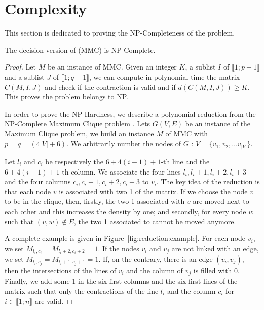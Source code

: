 \section{Complexity}
\label{sect:complexity}
 
This section is dedicated to proving the NP-Completeness of the problem.

  \begin{theorem}
  \label{theo:complexity}
  The decision version of (MMC) is NP-Complete.
  \end{theorem}
  \begin{proof}
 

    Let $M$ be an instance of MMC. Given an integer $K$, a sublist $I$ of $\llbracket 1; p-1 \rrbracket$ and a sublist $J$ of $\llbracket 1; q-1 \rrbracket$, we can compute in polynomial time the matrix $C(M,I,J)$ and check if the contraction is valid and if $d(C(M,I,J)) \geq K$. This proves the problem belongs to NP.

    In order to prove the NP-Hardness, we describe a polynomial reduction from the NP-Complete Maximum Clique problem \cite{Karp1972}. Lets $G(V,E)$ be an instance of the Maximum Clique problem, we build an instance $M$ of MMC with $p = q = (4|V| + 6)$. We arbitrarily number the nodes of $G$ : $V = \{v_1, v_2, \dots v_{|V|}\}$.

    Let $l_i$ and $c_i$ be respectively the $6+4(i-1)+1$-th line and the $6+4(i-1)+1$-th column. We associate the four lines $l_i, l_i+1, l_i+2, l_i+3$ and the four columns $c_i, c_i +1, c_i+2, c_i + 3$ to $v_i$. The key idea of the reduction is that each node $v$ is associated with two 1 of the matrix. If we choose the node $v$ to be in the clique, then, firstly, the two 1 associated with $v$ are moved next to each other and this increases the density by one; and secondly, for every node $w$ such that $(v,w) \not\in E$, the two 1 associated to cannot be moved anymore.

A complete example is given in Figure~\ref{fig:reduction:example}. For each node $v_i$, we set $M_{l_i,c_i} = M_{l_i+2,c_i+2} = 1$. If the nodes $v_i$ and $v_j$ are not linked with an edge, we set $M_{l_i,c_j} = M_{l_i+1,c_j+1} = 1$. If, on the contrary, there is an edge $(v_i,v_j)$, then the intersections of the lines of $v_i$ and the column of $v_j$ is filled with 0. Finally, we add some 1 in the six first columns and the six first lines of the matrix such that only the contractions of the line $l_i$ and the column $c_i$ for $i \in \llbracket 1;n \rrbracket$ are valid.


\end{proof}
